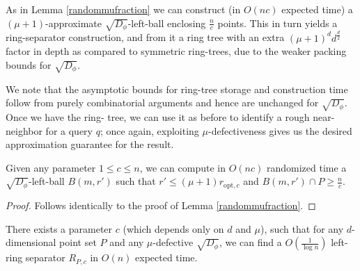 \documentclass[11pt]{myclass}
\newcommand{\breg}{\ensuremath{D_\phi}}
\begin{document}
As in Lemma \ref{randommufraction} we can construct  (in $O(nc)$ expected time) a $(\mu+1)$-approximate $\sqrt{\breg}$-left-ball 
enclosing $\frac{n}{c}$ points. This in turn yields a ring-separator construction, 
and from it a ring tree with an extra $(\mu+1)^d d^{\frac{d}{2}}$ factor in depth as compared to
symmetric ring-trees, due to the weaker packing bounds for $\sqrt{\breg}$.

 We note that the asymptotic bounds for ring-tree storage and construction time follow from purely combinatorial arguments
 and hence are unchanged for $\sqrt{\breg}$. 
Once we have the ring- tree, we can use it as before to identify a rough near-neighbor for a query $q$;
 once again, exploiting $\mu$-defectiveness gives us the desired approximation guarantee for the result.

 \begin{lemma} \label{randommufractionassym}
 Given any parameter $1 \leq c \leq n$, we can compute in $O(nc)$  randomized time a $\sqrt{\breg}$-left-ball $B(m,r')$ such that $r' \leq (\mu + 1) r_{\text{opt},c}$ and $B(m,r') \cap P \geq \frac{n}{c}$.
\end{lemma}  

\begin{proof}
 Follows identically to the proof of Lemma \ref{randommufraction}.
\end{proof}


\begin{lemma}\label{ringassym}
There exists a parameter $c$ (which depends only on $d$ and $\mu$), such that for any $d$-dimensional point set $P$ and any $\mu$-defective $\sqrt{\breg}$, we can find a $O(\frac{1}{\log n})$ left-ring separator $R_{P,c}$
in $O(n)$ expected time.
\end{lemma}
 
\end{document}
